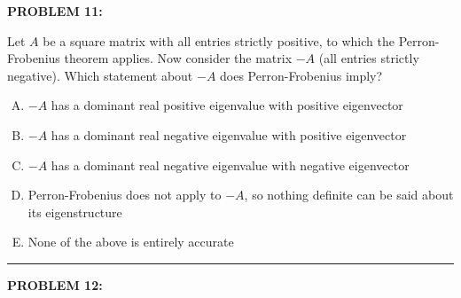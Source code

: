 \documentclass[12pt]{amsart}
\newcommand{\divider}{
  \vspace{-1em} %
  \noindent
  \raisebox{-0.15ex}{\textbullet}%
  \hspace{0.5em}%
  \rule[0.5ex]{0.95\textwidth}{1.0pt}%
  \hspace{0.5em}%
  \raisebox{-0.15ex}{\textbullet}%
  \vspace{0em} %
}
\begin{document}
{\bf PROBLEM 11:}

Let $A$ be a square matrix with all entries strictly positive, to which the Perron-Frobenius theorem applies. Now consider the matrix $-A$ (all entries strictly negative). Which statement about $-A$ does Perron-Frobenius imply?

\begin{enumerate}[(A)]
\item $-A$ has a dominant real positive eigenvalue with positive eigenvector
\item $-A$ has a dominant real negative eigenvalue with positive eigenvector
\item $-A$ has a dominant real negative eigenvalue with negative eigenvector
\item Perron-Frobenius does not apply to $-A$, so nothing definite can be said about its eigenstructure
\item None of the above is entirely accurate
\end{enumerate}

\divider

{\bf PROBLEM 12:}
\end{document}
